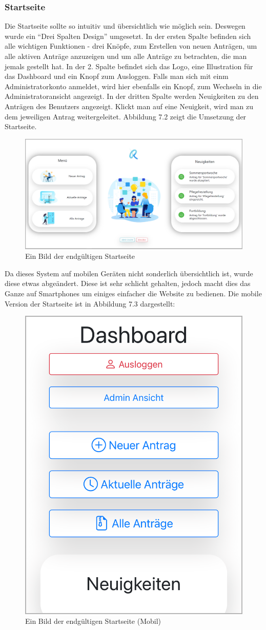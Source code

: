 \subsubsection{Startseite}
\label{chapter:implementierung-frontend-komponenten-startseite}
Die Startseite sollte so intuitiv und übersichtlich wie möglich sein. Deswegen wurde ein \enquote{Drei Spalten Design} umgesetzt. In der ersten Spalte befinden sich alle wichtigen Funktionen - drei Knöpfe, zum Erstellen von neuen Anträgen, um alle aktiven Anträge anzuzeigen und um alle Anträge zu betrachten, die man jemals gestellt hat. In der 2. Spalte befindet sich das Logo, eine Illustration für das Dashboard und ein Knopf zum Ausloggen. Falls man sich mit einm Administratorkonto anmeldet, wird hier ebenfalls ein Knopf, zum Wechseln in die Administratoransicht angezeigt. In der dritten Spalte werden Neuigkeiten zu den Anträgen des Benutzers angezeigt. Klickt man auf eine Neuigkeit, wird man zu dem jeweiligen Antrag weitergeleitet. Abbildung 7.2 zeigt die Umsetzung der Startseite.
\begin{figure}[H]
	\centering
	\includegraphics[width=1\linewidth]{images/website/dashboard}
	\caption[Dashboard]{Ein Bild der endgültigen Startseite}
	\label{fig:dashboard}
\end{figure}
Da dieses System auf mobilen Geräten nicht sonderlich übersichtlich ist, wurde diese etwas abgeändert. Diese ist sehr schlicht gehalten, jedoch macht dies das Ganze auf Smartphones um einiges einfacher die Website zu bedienen. Die mobile Version der Startseite ist in Abbildung 7.3 dargestellt:
\begin{figure}[H]
	\centering
	\includegraphics[width=0.4\linewidth]{images/website/dashboard_mobile}
	\caption[Dashboard Mobil]{Ein Bild der endgültigen Startseite (Mobil)}
	\label{fig:dashboardmobile}
\end{figure}

